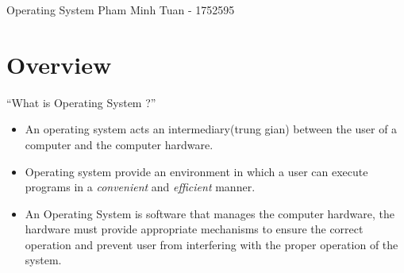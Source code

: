\documentclass[10pt]{article}
\newcommand{\quotes}[1]{``#1''}
\begin{document}
\begin{center}
\Huge Operating System 
\bigbreak
\large Pham Minh Tuan - 1752595
\end{center}

\renewcommand*\contentsname{Contents:}
\tableofcontents

\newpage

\section{Overview}

\quotes{What is Operating System ?}
\begin{itemize}
	\item An operating system acts an intermediary(trung gian) between the user of a computer and the computer hardware.
	\item Operating system provide an environment in which a user can execute programs in a \textit{convenient} and \textit{efficient} manner.
	\item An Operating System is software that manages the computer hardware, the hardware must provide appropriate mechanisms to ensure the correct operation and prevent user from interfering with the proper operation of the system.
\end{itemize}
\end{document}

